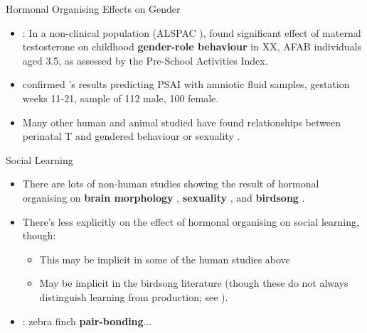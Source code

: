\documentclass[hyperref={pdfpagelabels=false}]{beamer}
\begin{document}
\begin{frame}{Hormonal Organising Effects on Gender}
\begin{itemize}

	\item \citet{hinesetal2002}: In a non-clinical population (ALSPAC \citealt{alspac2001}), found significant effect of maternal testosterone on childhood \textbf{gender-role behaviour} in XX, AFAB individuals aged 3.5, as assessed by the Pre-School Activities Index.
	\item \citet{auyeungetal2009} confirmed \citet{hinesetal2002}'s results predicting PSAI with amniotic fluid samples, gestation weeks 11-21, sample of 112 male, 100 female.
	\item Many other human and animal studied have found relationships between perinatal T and gendered behaviour or sexuality \citep[see][for reviews]{cohenbendahanetal2005, hines2006, balthazart2011, hinesetal2015}.
\end{itemize}
\end{frame}

\begin{frame}{Social Learning}
\begin{itemize}
	\item There are lots of non-human studies showing the result of hormonal organising on \textbf{brain morphology} \citep[e.g. in rats, going back to][]{gorski1978}, \textbf{sexuality} \citep[many references in][Chapts. 3-4]{balthazart2011}, and \textbf{birdsong} \citep[see][for an overview]{balthazartetal2009}.
	\item There's less explicitly on the effect of hormonal organising on social learning, though:
		\begin{itemize}
		\item This may be implicit in some of the human studies above
		\item May be implicit in the birdsong literature (though these do not always distinguish learning from production; see \citealt{balthazartetal2009}).
		\end{itemize}
	\item \citet{mansukhanietal1996}: zebra finch \textbf{pair-bonding}...

\end{itemize}

\end{frame}
\end{document}

